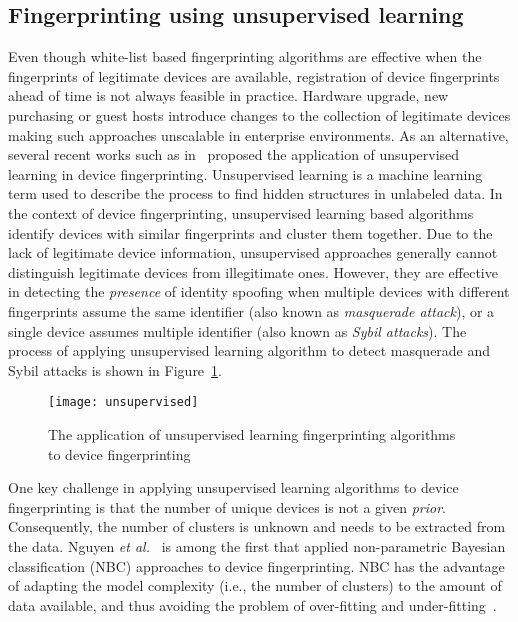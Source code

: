 \documentclass[journal,draftcls,onecolumn,11pt]{IEEEtran}
\begin{document}
\subsection{Fingerprinting using unsupervised learning}

Even though white-list based fingerprinting algorithms are effective when the fingerprints of legitimate devices are available, registration of device fingerprints ahead of time is not always feasible in practice. Hardware upgrade, new purchasing or guest hosts introduce changes to the collection of legitimate devices making such approaches unscalable in enterprise environments. As an alternative, several recent works such as in~\cite{Nguyen2011,Chen} proposed the application of unsupervised learning in device fingerprinting. Unsupervised learning is a machine learning term used to describe the process to find hidden structures in unlabeled data. In the context of device fingerprinting, unsupervised learning based algorithms identify devices with similar fingerprints and cluster them together. Due to the lack of legitimate device information, unsupervised approaches generally cannot distinguish legitimate devices from illegitimate ones. However, they are effective in detecting the {\it presence} of identity spoofing when multiple devices with different fingerprints assume the same identifier (also known as {\it masquerade attack}), or a single device assumes multiple identifier (also known as {\it Sybil attacks}). The process of applying unsupervised learning algorithm to detect masquerade and Sybil attacks is shown in Figure~\ref{unsupervised}.
 
\begin{figure}[ht!]
\centering
\texttt{[image: unsupervised]}
\caption{The application of unsupervised learning fingerprinting algorithms to device fingerprinting}
\label{unsupervised}
\end{figure}

One key challenge in applying unsupervised learning algorithms to device fingerprinting is that the number of unique devices is not a given {\it prior}. Consequently, the number of clusters is unknown and needs to be extracted from the data. Nguyen {\it et al.}~\cite{Nguyen2011} is among the first that applied non-parametric Bayesian classification (NBC) approaches to device fingerprinting. NBC has the advantage of adapting the model complexity (i.e., the number of clusters) to the amount of data available, and thus avoiding the problem of over-fitting and under-fitting~\cite{bishop2006pattern}.
\end{document}
